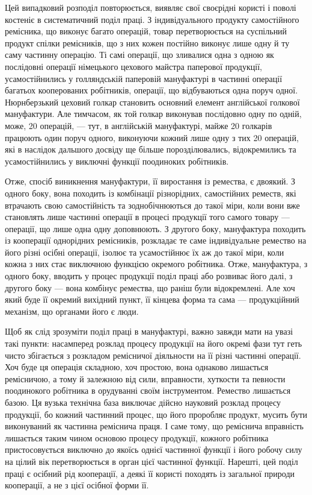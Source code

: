 \parcont{}  %
Цей випадковий розподіл повторюється, виявляє свої своєрідні
користі і поволі костеніє в систематичний поділ праці. З індивідуального
продукту самостійного ремісника, що виконує багато
операцій, товар перетворюється на суспільний продукт спілки
ремісників, що з них кожен постійно виконує лише одну й ту
саму частинну операцію. Ті самі операції, що зливалися одна
з одною як послідовні операції німецького цехового майстра
паперової продукції, усамостійнились у голляндській паперовій
мануфактурі в частинні операції багатьох кооперованих робітників,
операції, що відбуваються одна поруч одної. Нюрнберзький
цеховий голкар становить основний елемент англійської голкової
мануфактури. Але тимчасом, як той голкар виконував послідовно
одну по одній, може, 20 операцій, — тут, в англійській мануфактурі,
майже 20 голкарів працюють один поруч одного, виконуючи
кожний лише одну з тих 20 операцій, які в наслідок дальшого
досвіду ще більше порозділювались, відокремились та усамостійнились
у виключні функції поодиноких робітників.

Отже, спосіб виникнення мануфактури, її виростання із ремества,
є двоякий. З одного боку, вона походить із комбінації
різнорідних, самостійних реместв, які втрачають свою самостійність
та зоднобічнюються до такої міри, коли вони вже становлять
лише частинні операції в процесі продукції того самого товару —
операції, що лише одна одну доповнюють. З другого боку, мануфактура
походить із кооперації однорідних ремісників, розкладає
те саме індивідуальне ремество на його різні осібні операції,
ізолює та усамостійнює їх аж до такої міри, коли кожна з них
стає виключною функцією окремого робітника. Отже, мануфактура,
з одного боку, вводить у процес продукції поділ праці
або розвиває його далі, з другого боку — вона комбінує ремества,
що раніш були відокремлені. Але хоч який буде її окремий вихідний
пункт, її кінцева форма та сама — продукційний механізм,
що органами його є люди.

Щоб як слід зрозуміти поділ праці в мануфактурі, важно
завжди мати на увазі такі пункти: насамперед розклад процесу
продукції на його окремі фази тут геть чисто збігається з розкладом
ремісничої діяльности на її різні частинні операції. Хоч буде
ця операція складною, хоч простою, вона однаково лишається
ремісничою, а тому й залежною від сили, вправности, хуткости
та певности поодинокого робітника в орудуванні своїм інструментом.
Ремество лишається базою. Ця вузька технічна база
виключає дійсно науковий розклад процесу продукції, бо кожний
частинний процес, що його проробляє продукт, мусить бути
виконуваний як частинна реміснича праця. І саме тому, що реміснича
вправність лишається таким чином основою процесу продукції,
кожного робітника пристосовується виключно до якоїсь
однієї частинної функції і його робочу силу на цілий вік перетворюється
в орган цієї частинної функції. Нарешті, цей поділ праці
є осібний рід кооперації, а деякі її користі походять із загальної
природи кооперації, а не з цієї осібної форми її.
